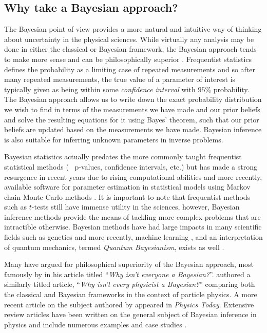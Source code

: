 \subsection{Why take a Bayesian approach?}
The Bayesian point of view provides a more natural and intuitive way of thinking about uncertainty in the physical sciences. While virtually any analysis may be done in either the classical or Bayesian framework, the Bayesian approach tends to make more sense and can be philosophically superior \citep{Gelman13}. Frequentist statistics defines the probability as a limiting case of repeated measurements and so after many repeated measurements, the true value of a parameter of interest is typically given as being within some \emph{confidence interval} with $95\%$ probability. The Bayesian approach allows us to write down the exact probability distribution we wish to find in terms of the measurements we have made and our prior beliefs and solve the resulting equations for it using Bayes' theorem, such that our prior beliefs are updated based on the measurements we have made. Bayesian inference is also suitable for inferring unknown parameters in inverse problems.

Bayesian statistics actually predates the more commonly taught frequentist statistical methods (\eg~ p-values, confidence intervals, etc.) but has made a strong resurgence in recent years due to rising computational abilities and more recently, available software for parameter estimation in statistical models using Markov chain Monte Carlo methods \citep{Brooks03}. It is important to note that frequentist methods such as $t$-tests still have immense utility in the sciences, however, Bayesian inference methods provide the means of tackling more complex problems that are intractible otherwise. Bayesian methods have had large impacts in many scientific fields such as genetics \citep{Beaumont04} and more recently, machine learning \citep{Murphy12}, and an interpretation of quantum mechanics, termed \emph{Quantum Bayesianism}, exists as well \citep{Timpson08}. 

Many have argued for philosophical superiority of the Bayesian approach, most famously by \citet{Efron86} in his article titled ``\textit{Why isn't everyone a Bayesian?}''. \citet{Cousins95} authored a similarly titled article, ``\textit{Why isn't every physicist a Bayesian?}'' comparing both the classical and Bayesian frameworks in the context of particle physics. A more recent article on the subject authored by \citet{Lyons12} appeared in \emph{Physics Today}. Extensive review articles have been written on the general subject of Bayesian inference in physics and include numerous examples and case studies \citet{vonToussaint11,Dose03,Dagostini03}.

